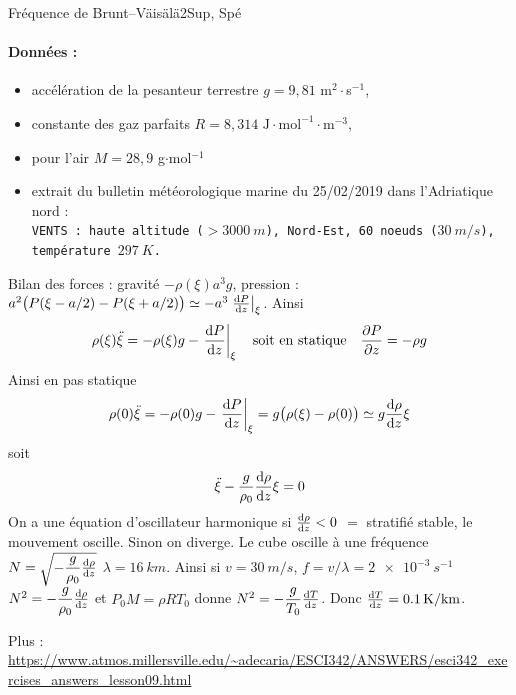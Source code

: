 \begin{exercise}{Fréquence de Brunt--Väisälä}{2}{Sup, Spé}
\paragraph{Données :}
\begin{itemize}
    \item accélération de la pesanteur terrestre $g = 9,81$ m$^2\cdot$s$^{-1}$,
    \item constante des gaz parfaits $R = 8,314$ $\mathrm{J\cdot mol^{-1}\cdot m^{-3}}$,
    \item pour l'air $M = 28,9$ g$\cdot$mol$^{-1}$
    \item extrait du bulletin météorologique marine du 25/02/2019 dans l'Adriatique nord : \\
    \texttt{VENTS : haute altitude ($> \SI{3000}{m}$), Nord-Est, 60 noeuds ($\SI{30}{m/s}$), température $\SI{297}{K}$.}

\end{itemize}
\end{exercise}

\begin{solution}

\begin{questions}
    \questioncours Bilan des forces : gravité $-\rho(\xi) a^3 g$, pression : $a^2 \qty\big(P(\xi-a/2) - P(\xi+a/2)) \simeq -a^3\eval{\dv{P}{z}}_\xi $. Ainsi
    $$\rho(\xi) \ddot{\xi} = - \rho(\xi) g - \eval{\dv{P}{z}}_\xi \qqtext{soit en statique} \pdv{P}{z} = -\rho g$$
    \question Ainsi en pas statique
    $$\rho(0) \ddot{\xi} = - \rho(0) g - \eval{\dv{P}{z}}_\xi = g\qty\big(\rho(\xi) - \rho(0)) \simeq g \dv{\rho}{z} \xi$$
    soit
    $$\ddot{\xi} -\dfrac{g}{\rho_0}\dv{\rho}{z}\xi = 0$$
    On a une équation d'oscillateur harmonique si $\dv{\rho}{z} < 0$ $=$ stratifié stable, le mouvement oscille. Sinon on diverge.
    \question Le cube oscille à une fréquence $N = \sqrt{-\dfrac{g}{\rho_0}\dv{\rho}{z}}$
    \question $\lambda = \SI{16}{km}$. Ainsi si $v =\SI{30}{m/s}$, $f = v/\lambda = \SI{2e-3}{s^{-1}}$
    \question $N^2 = -\dfrac{g}{\rho_0}\dv{\rho}{z}$ et $P_0 M = \rho R T_0$ donne $N^2 = -\dfrac{g}{T_0}\dv{T}{z}$. Donc $\dv{T}{z} = \SI{0.1}{K/km}$.
\end{questions}

Plus : \url{https://www.atmos.millersville.edu/~adecaria/ESCI342/ANSWERS/esci342_exercises_answers_lesson09.html}

\end{solution}